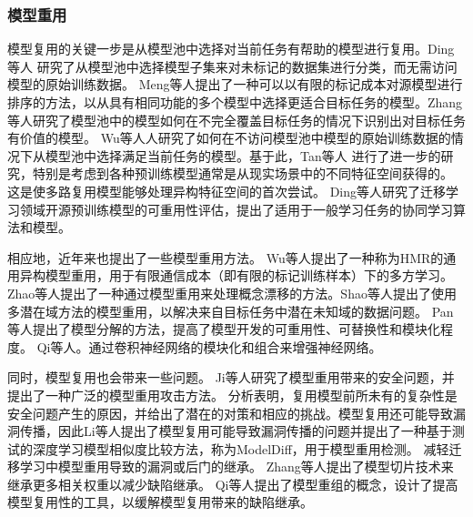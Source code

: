 \documentclass[fontset=macnew,UTF8]{article} %
\begin{document}
\subsubsection{模型重用}
 模型复用的关键一步是从模型池中选择对当前任务有帮助的模型进行复用。Ding等人\cite{ding2020boosting} 研究了从模型池中选择模型子集来对未标记的数据集进行分类，而无需访问模型的原始训练数据。 Meng等人\cite{meng2021measuring}提出了一种可以以有限的标记成本对源模型进行排序的方法，以从具有相同功能的多个模型中选择更适合目标任务的模型。Zhang等人\cite{zhang2021towards}研究了模型池中的模型如何在不完全覆盖目标任务的情况下识别出对目标任务有价值的模型。 Wu等人\cite{wu2021model}人研究了如何在不访问模型池中模型的原始训练数据的情况下从模型池中选择满足当前任务的模型。基于此，Tan等人\cite{tan2022towards} 进行了进一步的研究，特别是考虑到各种预训练模型通常是从现实场景中的不同特征空间获得的。 这是使多路复用模型能够处理异构特征空间的首次尝试。 Ding等人\cite{ding2022pre}研究了迁移学习领域开源预训练模型的可重用性评估，提出了适用于一般学习任务的协同学习算法和模型。

相应地，近年来也提出了一些模型重用方法。 Wu等人\cite{wu2019heterogeneous}提出了一种称为HMR的通用异构模型重用，用于有限通信成本（即有限的标记训练样本）下的多方学习。 Zhao等人\cite{zhao2020handling}提出了一种通过模型重用来处理概念漂移的方法。Shao等人\cite{shao2021towards}提出了使用多潜在域方法的模型重用，以解决来自目标任务中潜在未知域的数据问题。 Pan等人\cite{pan2022decomposing}提出了模型分解的方法，提高了模型开发的可重用性、可替换性和模块化程度。 Qi等人\cite{qi2022patching}。通过卷积神经网络的模块化和组合来增强神经网络。

同时，模型复用也会带来一些问题。 Ji等人\cite{ji2018model}研究了模型重用带来的安全问题，并提出了一种广泛的模型重用攻击方法。 分析表明，复用模型前所未有的复杂性是安全问题产生的原因，并给出了潜在的对策和相应的挑战。模型复用还可能导致漏洞传播，因此Li等人\cite{li2021modeldiff}提出了模型复用可能导致漏洞传播的问题并提出了一种基于测试的深度学习模型相似度比较方法，称为ModelDiff，用于模型重用检测。 减轻迁移学习中模型重用导致的漏洞或后门的继承。 Zhang等人\cite{zhang2022remos}提出了模型切片技术来继承更多相关权重以减少缺陷继承。 Qi\cite{qi2023reusing}等人提出了模型重组的概念，设计了提高模型复用性的工具，以缓解模型复用带来的缺陷继承。
\end{document}
